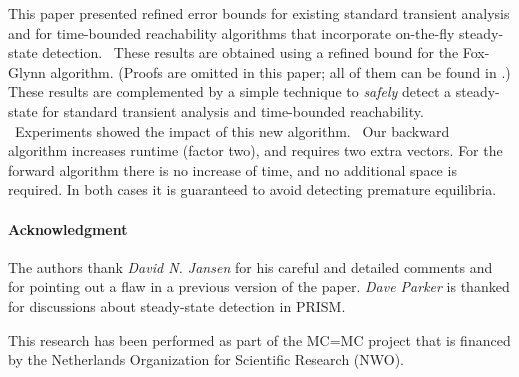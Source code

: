 \documentclass[times, 10pt,twocolumn]{article}
\begin{document}
	This paper presented refined error bounds for existing standard transient analysis and for time-bounded reachability algorithms that incorporate on-the-fly steady-state detection.  These results are obtained using a refined bound for the Fox-Glynn algorithm. (Proofs are omitted in this paper; all of them can be found in \cite{KatoenZ_TR05}.) These results are complemented by a simple technique to \emph{safely} detect a steady-state for standard transient analysis and time-bounded reachability.  Experiments showed the impact of this new algorithm.  Our backward algorithm increases runtime (factor two), and requires two extra vectors. For the forward algorithm there is no increase of time, and no additional space is required. In both cases it is guaranteed to avoid detecting premature equilibria.
	
	{\small \paragraph{Acknowledgment}
	The authors thank \emph{David N. Jansen} for his careful and detailed comments and for pointing out a flaw in a previous version of the paper. \emph{Dave Parker} is thanked for discussions about steady-state detection in PRISM.

	This research has been performed as part of the MC=MC project that is financed by the Netherlands Organization for Scientific Research (NWO).
	}

{\footnotesize
	
}
\end{document}
